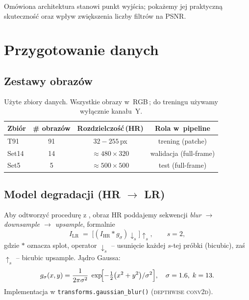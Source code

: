 \documentclass[11pt]{article}
\begin{document}
\bigskip
Omówiona architektura stanowi punkt wyjścia; 
pokażemy jej praktyczną skuteczność oraz wpływ zwiększenia liczby filtrów
na PSNR.

\section{Przygotowanie danych}
\label{sec:data}

\subsection{Zestawy obrazów}

\begin{table}[h]
\centering
\begin{tabular}{@{}lccc@{}}
\toprule
Zbiór   & \# obrazów & Rozdzielczość\,(HR) & Rola w~pipeline \\ \midrule
T91     & 91 & $32\!-\!255$\,px & trening (patche) \\
Set14   & 14 & $\approx 480\!\times\!320$ & walidacja (full-frame) \\
Set5    & 5  & $\approx 500\!\times\!500$ & test (full-frame) \\ \bottomrule
\end{tabular}
\caption{Użyte zbiory danych.  Wszystkie obrazy w~RGB\,; do treningu używamy wyłącznie kanału~Y.}
\label{tab:datasets}
\end{table}


\subsection{Model degradacji (HR $\rightarrow$ LR)}
\label{sec:data_degradation}

Aby odtworzyć procedurę z
, obraz HR poddajemy sekwencji
\emph{blur $\rightarrow$ downsample $\rightarrow$ upsample}, formalnie
\[
I_\mathrm{LR} \;=\;
\bigl[(I_\mathrm{HR} * g_\sigma) \downarrow_s\bigr]\!\uparrow_s ,
\qquad s = 2,
\]
gdzie $*$ oznacza splot, operator $\downarrow_s$ – usunięcie każdej
$s$-tej próbki (bicubic), zaś $\uparrow_s$ – bicubic upsample.  
Jądro Gaussa:
\begin{equation}
g_\sigma(x,y)=\frac{1}{2\pi\sigma^{2}}\;
  \exp\!\Bigl[-\tfrac12\bigl(x^{2}+y^{2}\bigr)/\sigma^{2}\Bigr],
\quad
\sigma=1.6,\; k=13.
\end{equation}
Implementacja w \texttt{transforms.gaussian\_blur()} (\textsc{depthwise conv2d}).
\end{document}
